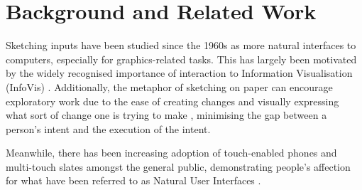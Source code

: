 \section{Background and Related Work}
Sketching inputs have been studied since the 1960s \citep{Sutherland1964} as more natural interfaces to computers, especially for graphics-related tasks. This has largely been motivated by the widely recognised importance of interaction to Information Visualisation (InfoVis) \citep{Lee2012}. Additionally, the metaphor of sketching on paper can encourage exploratory work due to the ease of creating changes and visually expressing what sort of change one is trying to make \citep{Citation Needed}, minimising the gap between a person's intent and the execution of the intent.

Meanwhile, there has been increasing adoption of touch-enabled phones and multi-touch slates amongst the general public, demonstrating people's affection for what have been referred to as Natural User Interfaces \cite{Lee2012}.